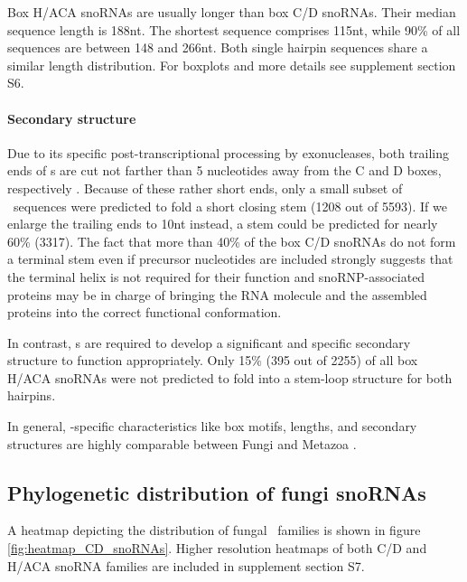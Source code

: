 Box H/ACA snoRNAs are usually longer than box C/D snoRNAs. Their
median sequence length is 188nt. The shortest sequence comprises
115nt, while 90\% of all sequences are between 148 and 266nt.  Both
single hairpin sequences share a similar length distribution. For
boxplots and more details see supplement section S6.

\paragraph{\textbf{Secondary structure}} Due to its specific
post-transcriptional processing by exonucleases, both trailing ends of
\cd s are cut not farther than 5 nucleotides away from the C and D
boxes, respectively \citep{Kishore:2013}. Because of these rather
short ends, only a small subset of \sno\ sequences were predicted to
fold a short closing stem (1208 out of 5593).  If we enlarge the
trailing ends to 10nt instead, a stem could be predicted for nearly
60\% (3317). The fact that more than 40\% of the box C/D snoRNAs do
not form a terminal stem even if precursor nucleotides are included
strongly suggests that the terminal helix is not required for their
function and snoRNP-associated proteins may be in charge of bringing
the RNA molecule and the assembled proteins into the correct
functional conformation.

In contrast, \haca s are required to develop a significant and
specific secondary structure to function appropriately. Only 15\% (395
out of 2255) of all box H/ACA snoRNAs were not predicted to fold into
a stem-loop structure for both hairpins.


In general, \sno -specific characteristics like box motifs, lengths,
and secondary structures are highly comparable between Fungi and
Metazoa \cite{Kehr:2014}.

\subsection{Phylogenetic distribution of fungi snoRNAs}

  A
heatmap depicting the distribution of fungal \cd\ families is shown in
figure \ref{fig:heatmap_CD_snoRNAs}. Higher resolution heatmaps of
both C/D and H/ACA snoRNA families are included in supplement section
S7.

